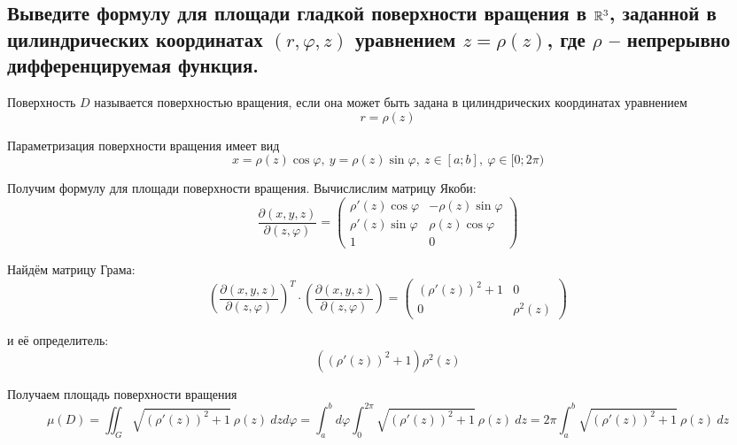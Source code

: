 \subsection{Выведите формулу для площади гладкой поверхности вращения в $\mathbb{R}^3$, заданной в цилиндрических координатах $(r, \varphi, z)$ уравнением $z = \rho(z)$, где $\rho$ -- непрерывно дифференцируемая функция.}

Поверхность $D$ называется поверхностью вращения, если она может быть задана в цилиндрических координатах уравнением
\[ r = \rho(z) \]

Параметризация поверхности вращения имеет вид
\[ x = \rho(z) \cos \varphi,\ y = \rho(z) \sin \varphi,\ z \in [a; b],\ \varphi \in [0; 2\pi) \]

Получим формулу для площади поверхности вращения. Вычислислим матрицу Якоби:
\[ \dfrac{\partial(x, y, z)}{\partial(z, \varphi)} =
\begin{pmatrix}
    \rho'(z) \cos \varphi & -\rho(z) \sin \varphi\\
    \rho'(z) \sin \varphi & \rho(z) \cos \varphi\\
    1                     & 0
\end{pmatrix}
\]

Найдём матрицу Грама:
\[ \left(\dfrac{\partial(x, y, z)}{\partial(z, \varphi)}\right)^T \cdot \left(\dfrac{\partial(x, y, z)}{\partial(z, \varphi)}\right) = 
\begin{pmatrix}
    (\rho'(z))^2 + 1 & 0\\
    0                 & \rho^2(z)
\end{pmatrix}
\]

и её определитель:
\[ ((\rho'(z))^2 + 1) \rho^2(z) \]

Получаем площадь поверхности вращения
\[ \mu(D) = \iint_{G} \sqrt{(\rho'(z))^2 + 1}\:\rho(z)\ dzd\varphi = \int_{a}^{b} d\varphi \int_{0}^{2\pi} \sqrt{(\rho'(z))^2 + 1}\:\rho(z)\ dz =
2\pi \int_{a}^{b} \sqrt{(\rho'(z))^2 + 1}\:\rho(z)\ dz\]